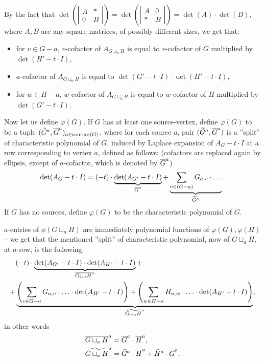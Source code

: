 \noindent By the fact that $\det\left(\left|\begin{array}{c|c}
A & \ast\\
\hline
0 & B
\end{array}\right|\right)
=
\det\left(\left|\begin{array}{c|c}
A & 0 \\
\hline
\ast & B
\end{array}\right|\right)
=
\det(A) \cdot \det(B),
$
where $A,B$ are any square matrices, of possibly different sizes,
we get that:
\begin{itemize}
	\item for $v \in G-a$, $v$-cofactor of $A_{G\sqcup_a H}$ is equal to $v$-cofactor of $G$ multiplied by $\det(H' - t\cdot I)$, 
	\item $a$-cofactor of $A_{G\sqcup_a H}$ is equal to $\det(G' - t\cdot I) \cdot \det(H' - t\cdot I)$,
	\item for $w \in H-a$, $w$-cofactor of $A_{G\sqcup_a H}$ is equal to $w$-cofactor of $H$ multiplied by $\det(G' - t\cdot I)$.
\end{itemize}
Now let us define $\varphi(G)$. If $G$ has at least one source-vertex, define $\varphi(G)$ to be a tuple $(\widetilde{G}^{a}, \overline{G}^{a})_{a \in \operatorname{sources}(G)}$, where for each source $a$, pair $(\widetilde{G}^{a}, \overline{G}^{a})$ is a ''split'' of characteristic polynomial of $G$, induced by Laplace expansion of $A_G-t\cdot I$ at a row corresponding to vertex $a$, defined as follows: (cofactors are replaced again by ellipsis, except of $a$-cofactor, which is denoted by $\overline{G}^{a}$)
$$
\det(A_G-t\cdot I) = (-t)\cdot \underbrace{\det(A_{G'} - t\cdot I)}_{\overline{G}^{a}} + \underbrace{\sum_{v \in (G-a)}G_{a,v} \cdot \ldots}_{\widetilde{G}^{a}}.
$$
If $G$ has no sources, define $\varphi(G)$ to be the characteristic polynomial of $G$.

$a$-entries of $\phi(G\sqcup_a H)$ are immediately polynomial functions of $\varphi(G), \varphi(H)$ --
we get that the mentioned ''split'' of characteristic polynomial, now of $G\sqcup_a H$, at $a$-row, is the following:
\begin{align*}
&(-t) \cdot \underbrace{\det(A_{G'} - t\cdot I) \cdot \det(A_{H'}-t\cdot I)}_{\overline{G\sqcup_a H}^{a}} +\\
+&\underbrace{\left(\sum_{v\in G-a} G_{a,v} \cdot \ldots \cdot \det(A_{H'} - t\cdot I) \right)+
\left(\sum_{w\in H-a} H_{a,w} \cdot \ldots \cdot \det(A_{H'} - t\cdot I)\right)}_{\widetilde{G\sqcup_a H}^{a}},
\end{align*}
in other words
\begin{align*}%
&\primecofact{G\sqcup_a H}{a} = \primecofact{G}{a} \cdot \primecofact{H}{a},\\
&\rest{G\sqcup_a H}{a} = \rest{G}{a} \cdot \primecofact{H}{a} + \rest{H}{a} \cdot \primecofact{G}{a}.
\end{align*}


